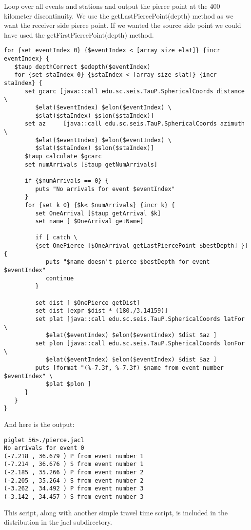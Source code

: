 Loop over all events and stations and output the pierce point at the 400
kilometer discontinuity. We use the getLastPiercePoint(depth) method as
we want the receiver side pierce point. If we wanted the source side point
we could have used the getFirstPiercePoint(depth) method.
\begin{verbatim}
for {set eventIndex 0} {$eventIndex < [array size elat]} {incr eventIndex} {
   $taup depthCorrect $edepth($eventIndex)
   for {set staIndex 0} {$staIndex < [array size slat]} {incr staIndex} {
      set gcarc [java::call edu.sc.seis.TauP.SphericalCoords distance \
         $elat($eventIndex) $elon($eventIndex) \
         $slat($staIndex) $slon($staIndex)]
      set az     [java::call edu.sc.seis.TauP.SphericalCoords azimuth \
         $elat($eventIndex) $elon($eventIndex) \
         $slat($staIndex) $slon($staIndex)]
      $taup calculate $gcarc
      set numArrivals [$taup getNumArrivals]

      if {$numArrivals == 0} {
         puts "No arrivals for event $eventIndex"
      }
      for {set k 0} {$k< $numArrivals} {incr k} {
         set OneArrival [$taup getArrival $k]
         set name [ $OneArrival getName]

         if [ catch \
         {set OnePierce [$OneArrival getLastPiercePoint $bestDepth] }] {
            puts "$name doesn't pierce $bestDepth for event $eventIndex"
            continue
         }

         set dist [ $OnePierce getDist]
         set dist [expr $dist * (180./3.14159)]
         set plat [java::call edu.sc.seis.TauP.SphericalCoords latFor \
            $elat($eventIndex) $elon($eventIndex) $dist $az ]
         set plon [java::call edu.sc.seis.TauP.SphericalCoords lonFor \
            $elat($eventIndex) $elon($eventIndex) $dist $az ]
         puts [format "(%-7.3f, %-7.3f) $name from event number $eventIndex" \
            $plat $plon ]
      }
   }
}
\end{verbatim}

And here is the output:
\begin{verbatim}
piglet 56>./pierce.jacl
No arrivals for event 0
(-7.218 , 36.679 ) P from event number 1
(-7.214 , 36.676 ) S from event number 1
(-2.185 , 35.266 ) P from event number 2
(-2.205 , 35.264 ) S from event number 2
(-3.262 , 34.492 ) P from event number 3
(-3.142 , 34.457 ) S from event number 3
\end{verbatim}

This script, along with another simple travel time script, is included in the
distribution in the jacl subdirectory.


